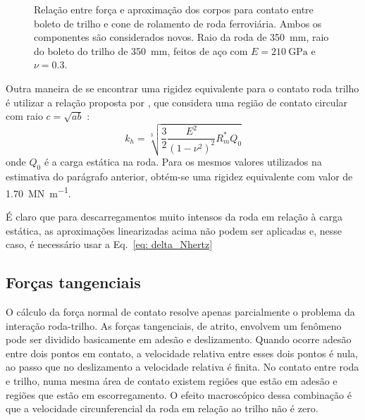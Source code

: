 \begin{figure}
    \centering
    \caption{Relação entre força e aproximação dos corpos para contato entre boleto de trilho e cone de rolamento de roda ferroviária.
    Ambos os componentes são considerados novos. Raio da roda de \SI{350}{\mm}, raio do boleto do trilho de \SI{350}{\mm},
    feitos de aço com $E=\SI{210}{\giga\pascal}$ e $\nu=\num{0,3}$.}
    \label{fig: graf_Nxdelta}
\end{figure}

Outra maneira de se encontrar uma rigidez equivalente para o contato roda trilho é utilizar a relação
proposta por , que considera uma região de contato
circular com raio $c = \sqrt{ab}$ :
\begin{equation}
    k_h = \sqrt[3]{\frac{3}{2} \frac{E^2}{\left(1-\nu^2\right)^2}R_m^* Q_0}
\end{equation}
onde $Q_0$ é a carga estática na roda. Para os mesmos valores utilizados na estimativa do parágrafo anterior,
obtém-se uma rigidez equivalente com valor de \SI{1,70}{\mega\newton\per\m}.

É claro que para descarregamentos muito intensos da roda  em relação à carga estática,
as aproximações linearizadas acima não podem ser aplicadas e,
nesse caso, é necessário usar a Eq.~\eqref{eq: delta_Nhertz}

\subsection{Forças tangenciais}
O cálculo da força normal de contato resolve apenas parcialmente o problema da interação roda-trilho. As forças tangenciais,
de atrito, envolvem um fenômeno pode ser dividido basicamente em adesão e deslizamento. Quando ocorre adesão entre dois pontos em contato,
a velocidade relativa entre esses dois pontos é nula, ao passo que no deslizamento a velocidade relativa é finita.
No contato entre roda e trilho, numa mesma área de contato existem regiões que estão em adesão e regiões que estão em
escorregamento. O efeito macroscópico dessa combinação é que a velocidade circunferencial da roda em relação ao trilho
não é zero. 

